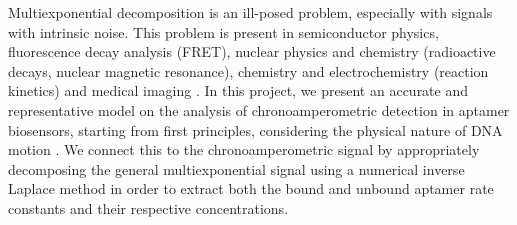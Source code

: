 Multiexponential decomposition is an ill-posed problem, especially with signals with intrinsic noise. This problem is present in semiconductor physics, fluorescence decay analysis (FRET), nuclear physics and chemistry (radioactive decays, nuclear magnetic resonance), chemistry and
electrochemistry (reaction kinetics) and medical imaging \cite{jibia2012appraisal}.
In this project, we present an accurate and representative model on the analysis of chronoamperometric detection in aptamer biosensors, starting from first principles, considering the physical nature of DNA motion \cite{ouldridge2012coarse}. We connect this to the chronoamperometric signal by appropriately decomposing the general multiexponential signal using a numerical inverse Laplace method \cite{provencher1982contin} in order to extract both the bound and unbound aptamer rate constants and their respective concentrations.\\\\

